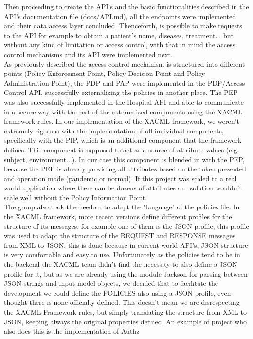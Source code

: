 Then proceeding to create the API's and the basic functionalities described in the API's documentation file (docs/API.md), all the endpoints were implemented and their data access layer concluded. Thenceforth, is possible to make requests to the API for example to obtain a patient's name, diseases, treatment... but without any kind of limitation or access control, with that in mind the access control mechanisms and its API were implemented next. \\

As previously described the access control mechanism is structured into different points (Policy Enforcement Point, Policy Decision Point and Policy Administration Point), the PDP and PAP were implemented in the PDP/Access Control API, successfully externalizing the policies in another place. The PEP was also successfully implemented in the Hospital API and able to communicate in a secure way with the rest of the externalized components using the XACML framework rules. In our implementation of the XACML framework, we weren't extremely rigorous with the implementation of all individual components, specifically with the PIP, which is an additional component that the framework defines. This component is supposed to act as a source of attribute values (e.g. subject, environment...). In our case this component is blended in with the PEP, because the PEP is already providing all attributes based on the token presented and operation mode (pandemic or normal). If this project was scaled to a real world application where there can be dozens of attributes our solution wouldn't scale well without the Policy Information Point. \\

The group also took the freedom to adapt the "language" of the policies file. In the XACML framework, more recent versions define different profiles for the structure of its messages, for example one of them is the JSON profile, this profile was used to adapt the structure of the REQUEST and RESPONSE messages from XML to JSON, this is done because in current world API's, JSON structure is very comfortable and easy to use. Unfortunately as the policies tend to be in the backend the XACML team didn't find the necessity to also define a JSON profile for it, but as we are already using the module Jackson \cite{jackson} for parsing between JSON strings and input model objects, we decided that to facilitate the development we could define the POLICIES also using a JSON profile, even thought there is none officially defined. This doesn't mean we are disrespecting the XACML Framework rules, but simply translating the structure from XML to JSON, keeping always the original properties defined. An example of project who also does this is the implementation of Authz \cite{authz} \\

